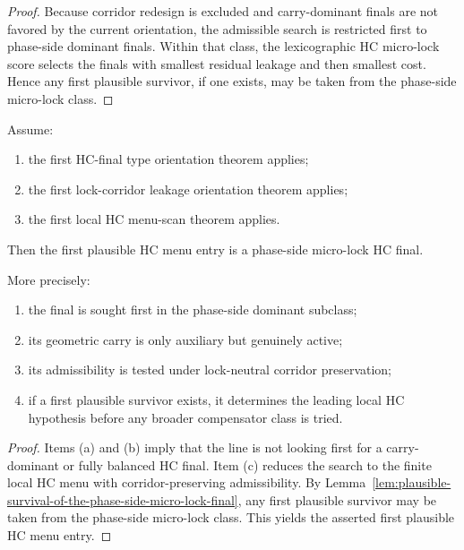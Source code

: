 \begin{proof}
Because corridor redesign is excluded and carry-dominant finals are not favored by the current orientation, the admissible search is restricted first to phase-side dominant finals. Within that class, the lexicographic HC micro-lock score selects the finals with smallest residual leakage and then smallest cost. Hence any first plausible survivor, if one exists, may be taken from the phase-side micro-lock class.
\end{proof}

\begin{theorem}
\label{thm:first-plausible-hc-menu-entry-theorem}
Assume:
\begin{enumerate}[leftmargin=2em,label=(\alph*)]
 \item the first HC-final type orientation theorem applies;
 \item the first lock-corridor leakage orientation theorem applies;
 \item the first local HC menu-scan theorem applies.
\end{enumerate}
Then the first plausible HC menu entry is a phase-side micro-lock HC final.

More precisely:
\begin{enumerate}[leftmargin=2em,label=(\roman*)]
 \item the final is sought first in the phase-side dominant subclass;
 \item its geometric carry is only auxiliary but genuinely active;
 \item its admissibility is tested under lock-neutral corridor preservation;
 \item if a first plausible survivor exists, it determines the leading local HC hypothesis before any broader compensator class is tried.
\end{enumerate}
\end{theorem}

\begin{proof}
Items (a) and (b) imply that the line is not looking first for a carry-dominant or fully balanced HC final. Item (c) reduces the search to the finite local HC menu with corridor-preserving admissibility. By Lemma~\ref{lem:plausible-survival-of-the-phase-side-micro-lock-final}, any first plausible survivor may be taken from the phase-side micro-lock class. This yields the asserted first plausible HC menu entry.
\end{proof}

